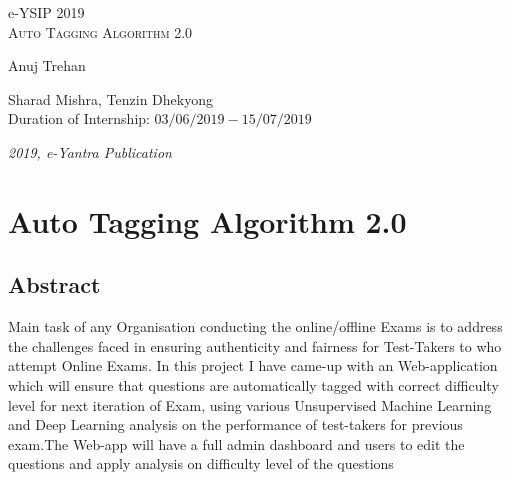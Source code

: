 \documentclass[a4paper,12pt,oneside]{book}
\begin{document}
\begin{titlepage}
\raggedright
{\Large e-YSIP 2019\\[1cm]}
{\Huge\scshape Auto Tagging Algorithm 2.0 \\[.1in]}
\vfill
\begin{flushright}
{\large Anuj Trehan\\}

{\large Sharad Mishra, Tenzin Dhekyong\\}
{\large Duration of Internship: $ 03/06/2019-15/07/2019 $ \\}
\end{flushright}

{\itshape 2019, e-Yantra Publication}
\end{titlepage}

\chapter[Project Tag]{Auto Tagging Algorithm 2.0}
\section*{Abstract}
Main task of any Organisation conducting
the online/offline Exams is to address the
challenges faced in ensuring authenticity
and fairness for Test-Takers to who attempt
Online Exams. In this project I have came-up
with an Web-application which will ensure
that questions are automatically tagged with
correct difficulty level for next iteration of
Exam, using various Unsupervised
Machine Learning and Deep Learning analysis
on the performance of test-takers for previous
exam.The Web-app will have a full admin
dashboard and users to edit the questions and
apply analysis on difficulty level of the questions
\end{document}

